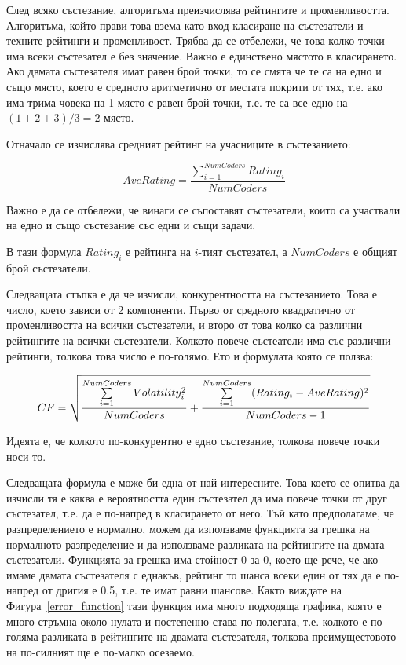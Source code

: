 \documentclass[a4paper,12pt]{article}
\begin{document}
  След всяко състезание, алгоритъма преизчислява рейтингите и променливостта. Алгоритъма, който прави това взема като вход класиране на състезатели и техните рейтинги и променливост. Трябва да се отбележи, че това колко точки има всеки състезател е без значение. Важно е единствено мястото в класирането. Ако двмата състезателя имат равен брой точки, то се смята че те са на едно и също място, което е средното аритметично от местата покрити от тях, т.е. ако има трима човека на 1 място с равен брой точки, т.е. те са все едно на \((1 + 2 + 3) / 3 = 2\) място.
  
  Отначало се изчислява средният рейтинг на учасниците в състезанието:
  
  \begin{equation} \label{eq:ave_rating}
    AveRating = \frac{\sum\limits_{i=1}^{NumCoders} Rating_{i}}{NumCoders}
  \end{equation}
  
  Важно е да се отбележи, че винаги се съпоставят състезатели, които са участвали на едно и също състезание със едни и същи задачи.
  
  В тази формула \(Rating_i\) е рейтинга на \(i\)-тият състезател, а \(NumCoders\) е общият брой състезатели.
  
  Следващата стъпка е да че изчисли, конкурентността на състезанието. Това е число, което зависи от 2 компоненти. Първо от средното квадратично от променливостта на всички състезатели, и второ от това колко са различни рейтингите на всички състезатели. Колкото повече състеатели има със различни рейтинги, толкова това число е по-голямо. Ето и формулата която се ползва: 
  
  \begin{equation}
    CF = \sqrt{\\
      \frac{\sum\limits_{i=1}^{NumCoders}Volatility_i^2}{NumCoders}\\
      +\\
      \frac{\sum\limits_{i=1}^{NumCoders}(Rating_i-AveRating)^2}{NumCoders - 1}\\
    }
  \end{equation}
  
  Идеята е, че колкото по-конкурентно е едно състезание, толкова повече точки носи то.
  
  Следващата формула е може би една от най-интересните. Това което се опитва да изчисли тя е каква е вероятността един състезател да има повече точки от друг състезател, т.е. да е по-напред в класирането от него. Тъй като предполагаме, че разпределението е нормално, можем да използваме функцията за грешка на нормалното разпределение и да използваме разликата на рейтингите на двмата състезатели. Функцията за грешка има стойност 0 за 0, което ще рече, че ако имаме двмата състезателя с еднакъв, рейтинг то шанса всеки един от тях да е по-напред от дригия е 0.5, т.е. те имат равни шансове. Както виждате на Фигура~\ref{error_function} тази функция има много подходяща графика, която е много стръмна около нулата и постепенно става по-полегата, т.е. колкото е по-голяма разликата в рейтингите на двамата състезателя, толкова преимущестовото на по-силният ще е по-малко осезаемо.
  
\end{document}
